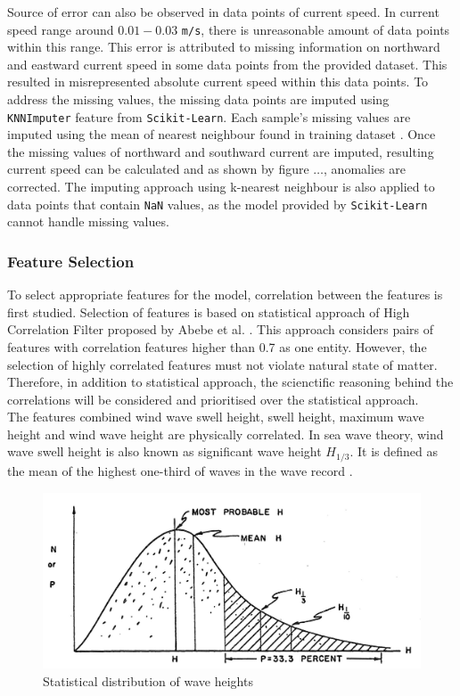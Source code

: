 Source of error can also be observed in data points of current speed. In current speed range around $0.01 - 0.03$ \verb|m/s|, there is unreasonable amount of data points within this range. This error is attributed to missing information on northward and eastward current speed in some data points from the provided dataset. This resulted in misrepresented absolute current speed within this data points. To address the missing values, the missing data points are imputed using {\tt KNNImputer} feature from {\tt Scikit-Learn}. Each sample's missing values are imputed using the mean of nearest neighbour found in training dataset \cite{FabianPedregosa.2011}. Once the missing values of northward and southward current are imputed, resulting current speed can be calculated and as shown by figure $\dots$, anomalies are corrected. The imputing approach using k-nearest neighbour is also applied to data points that contain {\tt NaN} values, as the model provided by {\tt Scikit-Learn} cannot handle missing values.\\

\subsubsection{Feature Selection}\label{feature_select}

To select appropriate features for the model, correlation between the features is first studied. Selection of features is based on statistical approach of High Correlation Filter proposed by Abebe et al. \cite{Abebe.2020}. This approach considers pairs of features with correlation features higher than 0.7 as one entity. However, the selection of highly correlated features must not violate natural state of matter. Therefore, in addition to statistical approach, the scienctific reasoning behind the correlations will be considered and prioritised over the statistical approach.\\

The features combined wind wave swell height, swell height, maximum wave height and wind wave height are physically correlated. In sea wave theory, wind wave swell height is also known as significant wave height $H_{1/3}$. It is defined as the mean of the highest one-third of waves in the wave record \cite{Holthuijsen.2007}. \\

\begin{figure}
    \centering
        \includegraphics[width=.85\textwidth]{02_figures/Bretschneider_1965_wavedist.jpg}
        \caption{Statistical distribution of wave heights \cite{bretschneider.1965}}
        \label{fig:wavestats}
\end{figure}

